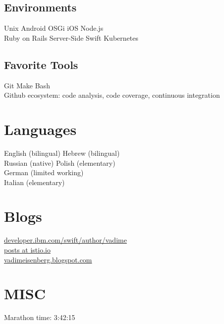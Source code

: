 \documentclass[]{deedy-resume}
\begin{document}
\begin{minipage}[t]{0.33\textwidth}
\subsection{Environments}
Unix \textbullet{}  Android \textbullet{}  OSGi \textbullet{} iOS \textbullet{} Node.js \\
Ruby on Rails \textbullet{} Server-Side Swift \textbullet{} Kubernetes
\sectionsep

\subsection{Favorite Tools}
Git \textbullet{}  Make \textbullet{}  Bash \textbullet{} \\
Github ecosystem: code analysis, code coverage, continuous integration
\sectionsep

\section{Languages}
\vspace{\topsep} %
English (bilingual) \textbullet{} Hebrew (bilingual) \\
Russian (native)  \textbullet{} Polish (elementary) \\
German (limited working) \\
Italian (elementary)
\sectionsep

\sectionsep

\section{Blogs}
\href{https://developer.ibm.com/swift/author/vadime/}{developer.ibm.com/swift/author/vadime} \\
\href{https://istio.io/search.html?q=vadim\%20eisenberg}{posts at istio.io} \\
\href{http://vadimeisenberg.blogspot.com}{vadimeisenberg.blogspot.com}
\sectionsep

\sectionsep

\section{MISC}
Marathon time: 3:42:15

%
%

\end{minipage}
\end{document}
